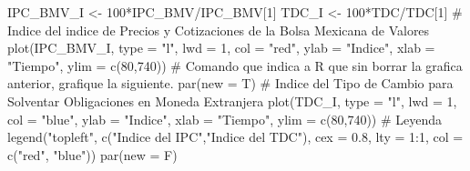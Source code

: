 \documentclass[
  a4paper,
]{article}
\newenvironment{Shaded}{}{}
\newcommand{\AttributeTok}[1]{\textcolor[rgb]{0.84,0.23,0.29}{#1}}
\newcommand{\CommentTok}[1]{\textcolor[rgb]{0.42,0.45,0.49}{#1}}
\newcommand{\DecValTok}[1]{\textcolor[rgb]{0.00,0.36,0.77}{#1}}
\newcommand{\FloatTok}[1]{\textcolor[rgb]{0.00,0.36,0.77}{#1}}
\newcommand{\FunctionTok}[1]{\textcolor[rgb]{0.44,0.26,0.76}{#1}}
\newcommand{\NormalTok}[1]{\textcolor[rgb]{0.14,0.16,0.18}{#1}}
\newcommand{\OtherTok}[1]{\textcolor[rgb]{0.44,0.26,0.76}{#1}}
\newcommand{\SpecialCharTok}[1]{\textcolor[rgb]{0.00,0.36,0.77}{#1}}
\newcommand{\StringTok}[1]{\textcolor[rgb]{0.01,0.18,0.38}{#1}}
\begin{document}
\begin{Shaded}
\begin{Highlighting}[]
\NormalTok{IPC\_BMV\_I }\OtherTok{\textless{}{-}} \DecValTok{100}\SpecialCharTok{*}\NormalTok{IPC\_BMV}\SpecialCharTok{/}\NormalTok{IPC\_BMV[}\DecValTok{1}\NormalTok{]}
\NormalTok{TDC\_I }\OtherTok{\textless{}{-}} \DecValTok{100}\SpecialCharTok{*}\NormalTok{TDC}\SpecialCharTok{/}\NormalTok{TDC[}\DecValTok{1}\NormalTok{]}
\CommentTok{\# Indice del indice de Precios y Cotizaciones de la Bolsa Mexicana de Valores}
\FunctionTok{plot}\NormalTok{(IPC\_BMV\_I, }\AttributeTok{type =} \StringTok{"l"}\NormalTok{, }\AttributeTok{lwd =} \DecValTok{1}\NormalTok{, }\AttributeTok{col =} \StringTok{"red"}\NormalTok{, }\AttributeTok{ylab =} \StringTok{"Indice"}\NormalTok{, }\AttributeTok{xlab =} \StringTok{"Tiempo"}\NormalTok{, }\AttributeTok{ylim =} \FunctionTok{c}\NormalTok{(}\DecValTok{80}\NormalTok{,}\DecValTok{740}\NormalTok{))}
\CommentTok{\# Comando que indica a R que sin borrar la grafica anterior, grafique la siguiente.}
\FunctionTok{par}\NormalTok{(}\AttributeTok{new =}\NormalTok{ T)}
\CommentTok{\# Indice del Tipo de Cambio para Solventar Obligaciones en Moneda Extranjera}
\FunctionTok{plot}\NormalTok{(TDC\_I, }\AttributeTok{type =} \StringTok{"l"}\NormalTok{, }\AttributeTok{lwd =} \DecValTok{1}\NormalTok{, }\AttributeTok{col =} \StringTok{"blue"}\NormalTok{, }\AttributeTok{ylab =} \StringTok{"Indice"}\NormalTok{, }\AttributeTok{xlab =} \StringTok{"Tiempo"}\NormalTok{, }\AttributeTok{ylim =} \FunctionTok{c}\NormalTok{(}\DecValTok{80}\NormalTok{,}\DecValTok{740}\NormalTok{))}
\CommentTok{\# Leyenda}
\FunctionTok{legend}\NormalTok{(}\StringTok{"topleft"}\NormalTok{, }\FunctionTok{c}\NormalTok{(}\StringTok{"Indice del IPC"}\NormalTok{,}\StringTok{"Indice del TDC"}\NormalTok{), }\AttributeTok{cex =} \FloatTok{0.8}\NormalTok{, }\AttributeTok{lty =} \DecValTok{1}\SpecialCharTok{:}\DecValTok{1}\NormalTok{, }\AttributeTok{col =} \FunctionTok{c}\NormalTok{(}\StringTok{"red"}\NormalTok{, }\StringTok{"blue"}\NormalTok{))}
\FunctionTok{par}\NormalTok{(}\AttributeTok{new =}\NormalTok{ F)}
\end{Highlighting}
\end{Shaded}
\end{document}
